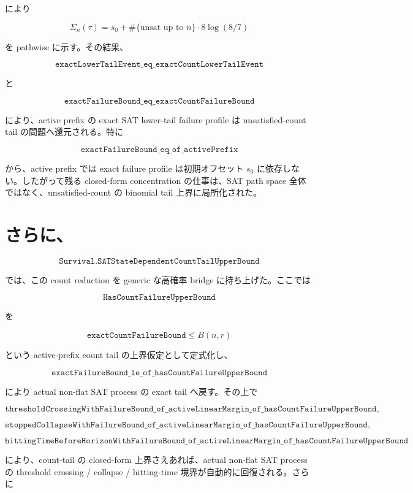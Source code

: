 \documentclass[12pt,a4paper]{article}
\begin{document}
により

\[
\Sigma_{n}(\tau)=s_0+\#\{\text{unsat up to }n\}\cdot 8\log(8/7)
\]

を pathwise に示す。その結果、

\[
\texttt{exactLowerTailEvent\_eq\_exactCountLowerTailEvent}
\]

と

\[
\texttt{exactFailureBound\_eq\_exactCountFailureBound}
\]

により、active prefix の exact SAT lower-tail failure profile は unsatisfied-count tail の問題へ還元される。特に

\[
\texttt{exactFailureBound\_eq\_of\_activePrefix}
\]

から、active prefix では exact failure profile は初期オフセット \(s_0\) に依存しない。したがって残る closed-form concentration の仕事は、SAT path space 全体ではなく、unsatisfied-count の binomial tail 上界に局所化された。

\section{さらに、}\label{ux3055ux3089ux306b-22}

\[
\texttt{Survival.SATStateDependentCountTailUpperBound}
\]

では、この count reduction を generic な高確率 bridge に持ち上げた。ここでは

\[
\texttt{HasCountFailureUpperBound}
\]

を

\[
\texttt{exactCountFailureBound} \le B(n,r)
\]

という active-prefix count tail の上界仮定として定式化し、

\[
\texttt{exactFailureBound\_le\_of\_hasCountFailureUpperBound}
\]

により actual non-flat SAT process の exact tail へ戻す。その上で

\[
\texttt{thresholdCrossingWithFailureBound\_of\_activeLinearMargin\_of\_hasCountFailureUpperBound},
\]

\[
\texttt{stoppedCollapseWithFailureBound\_of\_activeLinearMargin\_of\_hasCountFailureUpperBound},
\]

\[
\texttt{hittingTimeBeforeHorizonWithFailureBound\_of\_activeLinearMargin\_of\_hasCountFailureUpperBound}
\]

により、count-tail の closed-form 上界さえあれば、actual non-flat SAT process の threshold crossing / collapse / hitting-time 境界が自動的に回復される。さらに
\end{document}
